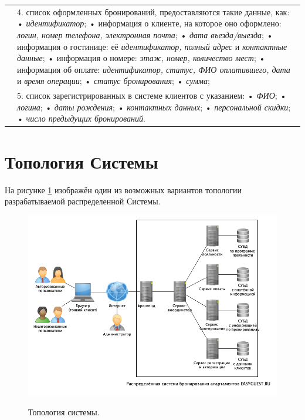 \begin{longtable}{|p{0.5cm}|p{15.5cm}|}
	&
	4. список оформленных бронирований, предоставляются такие данные, как: \newline
	• \textit{идентификатор}; \newline
	• информация о клиенте, на которое оно оформлено: \textit{логин, номер телефона, электронная почта}; \newline
	• \textit{дата въезда/выезда}; \newline
	• информация о гостинице: её \textit{идентификатор, полный адрес} и \textit{контактные данные}; \newline
	• информация о номере: \textit{этаж, номер, количество мест}; \newline	
	• информация об оплате: \textit{идентификатор, статус, ФИО оплатившего, дата} и \textit{время операции}; \newline
	• \textit{статус бронирования}; \newline
	• \textit{сумма}; \\
	\cline{2-2}
	
	&
	5. список зарегистрированных в системе клиентов с указанием: \newline
	• \textit{ФИО}; \newline
	• \textit{логина}; \newline
 	• \textit{даты рождения}; \newline
	• \textit{контактных данных}; \newline
	• \textit{персональной скидки}; \newline
	• \textit{число предыдущих бронирований}. \\
	\hline
\end{longtable}

\section*{Топология Системы}
На рисунке \ref{fig:topology} изображён один из возможных вариантов  топологии разрабатываемой распределенной Системы.
\begin{figure}[h]
	\begin{center}
		{\includegraphics[scale = 0.6]{img/pic/topology.png}}
		\caption{Топология системы.}
		\label{fig:topology}
	\end{center}
\end{figure}

